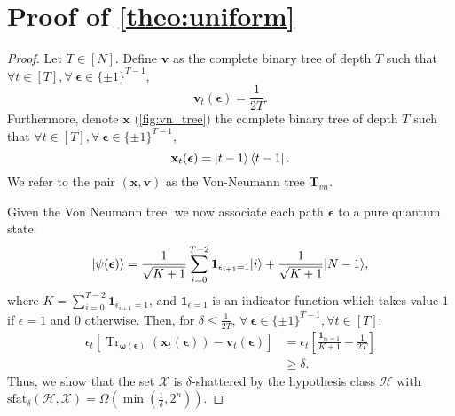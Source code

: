 
\section{Proof of \cref{theo:uniform}}\label{pf:uniform}

\begin{proof}
Let $T\in[N]$.
Define $\mathbf{v}$ as the complete binary tree of depth $T$ such that $\forall t\in[T],\forall \ \boldsymbol{\epsilon} \in \{\pm 1\}^{T-1}$,
\begin{equation}
    \mathbf{v}_t (\boldsymbol{\epsilon}) = \frac{1}{2T}. 
\end{equation}
Furthermore, denote $\mathbf x$ (\cref{fig:vn_tree}) the complete binary tree of depth $T$ such that $\forall t\in[T],\forall \ \boldsymbol{\epsilon} \in \{\pm 1\}^{T-1}$,
\begin{equation}
    \mathbf{x}_t(\boldsymbol{\epsilon}) = \ket{t-1} \bra{t-1}.
\end{equation}
We refer to the pair $(\mathbf{x}, \mathbf{v})$ as the Von-Neumann tree $\mathbf{T}_{vn}$. 


Given the Von Neumann tree, we now associate each path $\boldsymbol{\epsilon}$ to a pure quantum state:
\begin{equation}
\ket{\psi(\boldsymbol\epsilon)}=\frac 1{\sqrt{K+1}}\sum_{i=0}^{T-2} \mathbf{1}_{\epsilon_{i+1}=1}| i \rangle+\frac{1}{\sqrt{K+1}}| N-1 \rangle,
\end{equation}
where $K=\sum_{i=0}^{T-2}\mathbf{1}_{\epsilon_{i+1}=1}$, and $\mathbf{1}_{\epsilon = 1}$ is an indicator function which takes value $1$ if $\epsilon = 1$ and $0$ otherwise. Then, for $\delta\le \frac1{2T}$, $\forall \ \boldsymbol{\epsilon} \in \{\pm 1\}^{T-1}, \forall t \in [T]$:
\begin{align}
\label{eq:von_neumann_proof}
    \epsilon_t [\operatorname{Tr}_{\boldsymbol \omega(\boldsymbol \epsilon)}(\mathbf{x}_t(\boldsymbol{\epsilon})) - \mathbf{v}_t (\boldsymbol{\epsilon})] 
    &= \epsilon_t \left[\frac{\mathbf{1}_{\epsilon_{t}=1}}{K+1}-\frac1{2T}\right]
    \nonumber\\&\ge\delta.
\end{align}
 Thus, we show that the set $\mathcal{X}$ is $\delta$-shattered by the hypothesis class $\mathcal{H}$ with $\text{sfat}_\delta(\mathcal H, \mathcal{X})=\Omega(\min(\frac1\delta,2^n))$.

\end{proof}

